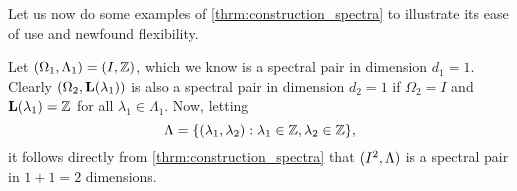 \documentclass[../thesis.tex]{subfiles}
\begin{document}
Let us now do some examples of \cref{thrm:construction_spectra} to illustrate its ease of use and newfound flexibility. 
\begin{example}\label{exmp:first_construction}
    Let $(\Omega_1,\Lambda_1)=(I, \mathbb{Z})$, which we know is a spectral pair in dimension $d_1=1$. Clearly $(\Omega_2,\mathbf{L}(\lambda_1))$ is also a spectral pair in dimension $d_2=1$ if $\Omega_2=I$ and $\mathbf{L}(\lambda_1) = \mathbb{Z}$ for all $\lambda_1 \in \Lambda_1$. Now, letting 
    \begin{equation}\label{eq:first_construction}
        \Lambda  = \{(\lambda_1,\lambda_2): \lambda_1 \in \mathbb{Z}, \lambda_2 \in \mathbb{Z} \},
    \end{equation}
    it follows directly from \cref{thrm:construction_spectra} that $(I^2, \Lambda)$ is a spectral pair in $1+1=2$ dimensions.
\end{example}
\end{document}
